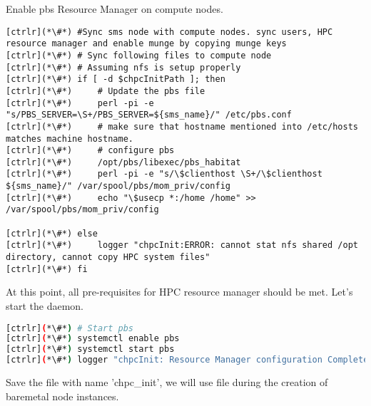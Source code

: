     Enable pbs Resource Manager on compute nodes.


\begin{lstlisting}
[ctrlr](*\#*) #Sync sms node with compute nodes. sync users, HPC resource manager and enable munge by copying munge keys
[ctrlr](*\#*) # Sync following files to compute node
[ctrlr](*\#*) # Assuming nfs is setup properly
[ctrlr](*\#*) if [ -d $chpcInitPath ]; then
[ctrlr](*\#*)     # Update the pbs file
[ctrlr](*\#*)     perl -pi -e "s/PBS_SERVER=\S+/PBS_SERVER=${sms_name}/" /etc/pbs.conf
[ctrlr](*\#*)     # make sure that hostname mentioned into /etc/hosts matches machine hostname. 
[ctrlr](*\#*)     # configure pbs
[ctrlr](*\#*)     /opt/pbs/libexec/pbs_habitat
[ctrlr](*\#*)     perl -pi -e "s/\$clienthost \S+/\$clienthost ${sms_name}/" /var/spool/pbs/mom_priv/config
[ctrlr](*\#*)     echo "\$usecp *:/home /home" >> /var/spool/pbs/mom_priv/config 

[ctrlr](*\#*) else
[ctrlr](*\#*)     logger "chpcInit:ERROR: cannot stat nfs shared /opt directory, cannot copy HPC system files"
[ctrlr](*\#*) fi
\end{lstlisting}

	At this point, all pre-requisites for HPC resource manager should be met. Let's start the daemon.


\begin{lstlisting}[language=bash,keywords={}]
[ctrlr](*\#*) # Start pbs 
[ctrlr](*\#*) systemctl enable pbs
[ctrlr](*\#*) systemctl start pbs
[ctrlr](*\#*) logger "chpcInit: Resource Manager configuration Complete"
\end{lstlisting}

	Save the file with name 'chpc\_init', we will use  file during the creation of baremetal node instances.

